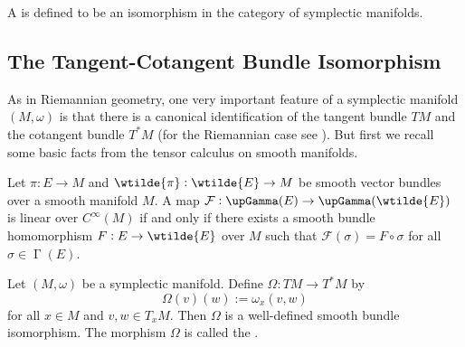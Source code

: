 \begin{definition}[Symplectomorphism]
	A  is defined to be an isomorphism in the category of symplectic manifolds.
\end{definition}

\subsection*{The Tangent-Cotangent Bundle Isomorphism}
As in Riemannian geometry, one very important feature of a symplectic manifold $(M,\omega)$ is that there is a canonical identification of the tangent bundle $TM$ and the cotangent bundle $T^*M$ (for the Riemannian case see \cite[341]{lee:smooth_manifolds:2013}). But first we recall some basic facts from the tensor calculus on smooth manifolds. 



\begin{proposition}
	\label{prop:bundle_homomorphism_characterisation_lemma}
	Let $\pi : E \to M$ and $\wtilde{\pi} : \wtilde{E} \to M$ be smooth vector bundles over a smooth manifold $M$. A map $\mathcal{F} : \upGamma(E) \to \upGamma(\wtilde{E})$ is linear over $C^\infty(M)$ if and only if there exists a smooth bundle homomorphism $F : E \to \wtilde{E}$ over $M$ such that $\mathcal{F}(\sigma) = F \circ \sigma$ for all $\sigma \in \upGamma(E)$.
\end{proposition}

\begin{theorem}
	\label{thm:tangent-cotangent_bundle_isomorphism}
	Let $(M,\omega)$ be a symplectic manifold. Define $\Omega : TM \to T^*M$ by
	\begin{equation}
		\label{eq:tangent-cotangent_isomorphism}
		\Omega(v)(w) := \omega_x(v,w)
	\end{equation}
	\noindent for all $x \in M$ and $v,w \in T_xM$. Then $\Omega$ is a well-defined smooth bundle isomorphism. The morphism $\Omega$ is called the .
\end{theorem}

